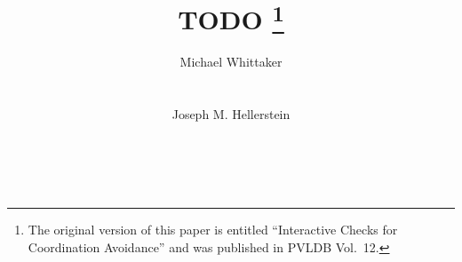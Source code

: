 \documentclass{research4cacm}
\begin{document}
\title{%
  TODO%
  \thanks{%
    The original version of this paper is entitled ``Interactive Checks for
    Coordination Avoidance'' and was published in PVLDB Vol.\ 12.
  }%
}

\author{
\alignauthor
Michael Whittaker\\
       \\
       \\
\alignauthor
Joseph M. Hellerstein\\
       \\
       \\
}

\maketitle

{}
{}
{}
{}
{}
{}
{}
{}
{}
{}


\balancecolumns
\end{document}
